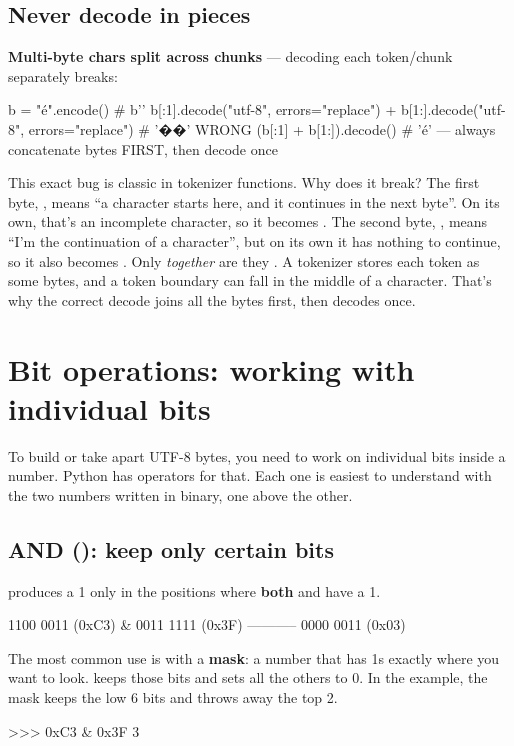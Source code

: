 \documentclass[10pt,a4paper]{article}
\begin{document}
\subsection{Never decode in pieces}
\begin{trapbox}
\textbf{Multi-byte chars split across chunks} — decoding each token/chunk separately breaks:
\end{trapbox}
\begin{utfcode}
b = "é".encode()          # b''
b[:1].decode("utf-8", errors="replace") + b[1:].decode("utf-8", errors="replace")   # '��'  WRONG
(b[:1] + b[1:]).decode()  # 'é'  — always concatenate bytes FIRST, then decode once
\end{utfcode}
This exact bug is classic in tokenizer  functions.
Why does it break? The first byte, , means “a character starts here, and it continues in the next byte”. On its own, that’s an incomplete character, so it becomes . The second byte, , means “I’m the continuation of a character”, but on its own it has nothing to continue, so it also becomes . Only \emph{together} are they . A tokenizer stores each token as some bytes, and a token boundary can fall in the middle of a character. That’s why the correct decode joins all the bytes first, then decodes once.
\setcounter{section}{2}
\section{Bit operations: working with individual bits}
To build or take apart UTF-8 bytes, you need to work on individual bits inside a number. Python has operators for that. Each one is easiest to understand with the two numbers written in binary, one above the other.
\subsection{AND (\code{\&\allowbreak{}}): keep only certain bits}
 produces a 1 only in the positions where \textbf{both}  and  have a 1.
\begin{txtcode}
    1100 0011     (0xC3)
  & 0011 1111     (0x3F)
  -----------
    0000 0011     (0x03)
\end{txtcode}
The most common use is with a \textbf{mask}: a number that has 1s exactly where you want to look.  keeps those bits and sets all the others to 0. In the example, the mask  keeps the low 6 bits and throws away the top 2.
\begin{txtcode}
>>> 0xC3 & 0x3F
3
\end{txtcode}
\end{document}
